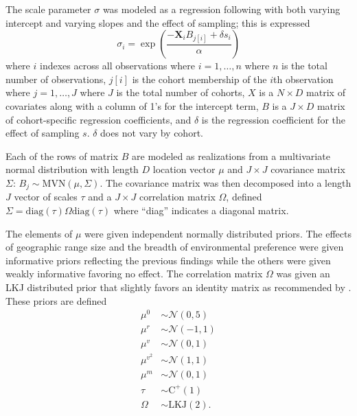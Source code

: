 \documentclass[11pt]{article}
\begin{document}
The scale parameter \(\sigma\) was modeled as a regression following \citet{Kleinbaum2005} with both varying intercept and varying slopes and the effect of sampling; this is expressed
\begin{equation}
  \sigma_{i} = \exp\left(\frac{-\mathbf{X}_{i} B_{j[i]} + \delta s_{i}}{\alpha}\right)
  \label{eq:sigma}
\end{equation}
where \(i\) indexes across all observations where \(i = 1, \dots, n\) where \(n\) is the total number of observations, \(j[i]\) is the cohort membership of the \(i\)th observation where \(j = 1, \dots, J\) where \(J\) is the total number of cohorts, \(X\) is a \(N \times D\) matrix of covariates along with a column of 1's for the intercept term, \(B\) is a \(J \times D\) matrix of cohort-specific regression coefficients, and \(\delta\) is the regression coefficient for the effect of sampling \(s\). \(\delta\) does not vary by cohort.

Each of the rows of matrix \(B\) are modeled as realizations from a multivariate normal distribution with length \(D\) location vector \(\mu\) and \(J \times J\) covariance matrix \(\Sigma\): \(B_{j} \sim \mathrm{MVN}(\mu, \Sigma)\). The covariance matrix was then decomposed into a length \(J\) vector of scales \(\tau\) and a \(J \times J\) correlation matrix \(\Omega\), defined \(\Sigma = \mathrm{diag}(\tau) \Omega \mathrm{diag}(\tau)\) where ``diag'' indicates a diagonal matrix.

The elements of \(\mu\) were given independent normally distributed priors. The effects of geographic range size  and the breadth of environmental preference were given informative priors reflecting the previous findings while the others were given weakly informative favoring no effect. The correlation matrix \(\Omega\) was given an LKJ distributed prior \citep{Lewandowski2009} that slightly favors an identity matrix as recommended by \citet{stan-manual:2014}. These priors are defined
\begin{equation}
  \begin{aligned}
    \mu^{0} &\sim \mathcal{N}(0, 5) \\
    \mu^{r} &\sim \mathcal{N}(-1, 1) \\
    \mu^{v} &\sim \mathcal{N}(0, 1) \\
    \mu^{v^{2}} &\sim \mathcal{N}(1, 1) \\
    \mu^{m} &\sim \mathcal{N}(0, 1) \\
    \tau &\sim \mathrm{C^{+}}(1) \\
    \Omega &\sim \text{LKJ}(2).
  \end{aligned}
  \label{eq:sigma_prior}
\end{equation}
\end{document}
